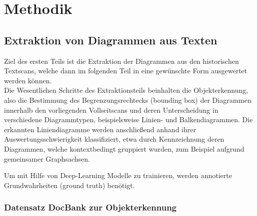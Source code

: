 \chapter{Methodik}
\label{ch:methodik}

\section{Extraktion von Diagrammen aus Texten}

Ziel des ersten Teils ist die Extraktion der Diagrammen aus den historischen Textscans, welche dann im folgenden Teil in eine gewünschte Form ausgewertet werden können.
\\
Die Wesentlichen Schritte des Extraktionsteils beinhalten die Objekterkennung, also die Bestimmung des Begrenzungsrechtecks (bounding box) der Diagrammen innerhalb den vorliegenden Vollseitscans und deren Unterscheidung in verschiedene Diagrammtypen, beispielsweise Linien- und Balkendiagrammen.
Die erkannten Liniendiagramme werden anschließend anhand ihrer Auswertungsschwierigkeit klassifiziert, etwa durch Kennzeichnung deren Diagrammen, welche kontextbedingt gruppiert wurden, zum Beispiel aufgrund gemeinsamer Graphsachsen.

Um mit Hilfe von Deep-Learning Modelle zu trainieren, werden annotierte Grundwahrheiten (ground truth) benötigt.

\subsection{Datensatz DocBank zur Objekterkennung}
\label{ch:chartbank}


